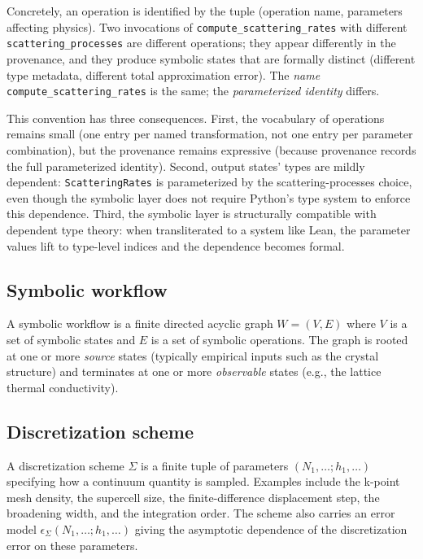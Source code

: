 \documentclass[11pt,a4paper]{article}
\begin{document}
Concretely, an operation is identified by the tuple (operation name, parameters affecting
physics). Two invocations of \texttt{compute\_scattering\_rates} with different
\texttt{scattering\_processes} are different operations; they appear differently in the
provenance, and they produce symbolic states that are formally distinct (different type metadata,
different total approximation error). The \emph{name} \texttt{compute\_scattering\_rates} is the
same; the \emph{parameterized identity} differs.

This convention has three consequences. First, the vocabulary of operations remains small (one
entry per named transformation, not one entry per parameter combination), but the provenance
remains expressive (because provenance records the full parameterized identity). Second, output
states' types are mildly dependent: \texttt{ScatteringRates} is parameterized by the
scattering-processes choice, even though the symbolic layer does not require Python's type system to
enforce this dependence. Third, the symbolic layer is structurally compatible with dependent type
theory: when transliterated to a system like Lean, the parameter values lift to type-level
indices and the dependence becomes formal.


\subsection{Symbolic workflow}

A symbolic workflow is a finite directed acyclic graph $W = (V, E)$ where $V$ is a set of
symbolic states and $E$ is a set of symbolic operations. The graph is rooted at one or more
\emph{source} states (typically empirical inputs such as the crystal structure) and terminates
at one or more \emph{observable} states (e.g., the lattice thermal conductivity).

\subsection{Discretization scheme}

A discretization scheme $\Sigma$ is a finite tuple of parameters $(N_1, \ldots; h_1, \ldots)$
specifying how a continuum quantity is sampled. Examples include the k-point mesh density, the
supercell size, the finite-difference displacement step, the broadening width, and the integration
order. The scheme also carries an error model $\epsilon_{\Sigma}(N_1, \ldots; h_1, \ldots)$
giving the asymptotic dependence of the discretization error on these parameters.
\end{document}
